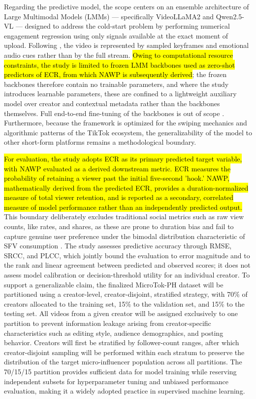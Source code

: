 Regarding the predictive model, the scope centers on an ensemble architecture of Large Multimodal Models (LMMs) — specifically VideoLLaMA2 and Qwen2.5-VL — designed to address the cold-start problem by performing numerical engagement regression using only signals available at the exact moment of upload. Following \cite{sun2025engagement}, the video is represented by sampled keyframes and emotional audio cues rather than by the full stream. \hl{Owing to computational resource constraints, the study is limited to frozen LMM backbones used as zero-shot predictors of ECR, from which NAWP is subsequently derived}; the frozen backbones therefore contain no trainable parameters, and where the study introduces learnable parameters, these are confined to a lightweight auxiliary model over creator and contextual metadata rather than the backbones themselves. Full end-to-end fine-tuning of the backbones is out of scope \cite{li2025vquala}. Furthermore, because the framework is optimized for the swiping mechanics and algorithmic patterns of the TikTok ecosystem, the generalizability of the model to other short-form platforms remains a methodological boundary.

\hl{For evaluation, the study adopts ECR as its primary predicted target variable, with NAWP evaluated as a derived downstream metric. ECR measures the probability of retaining a viewer past the initial five-second 'hook.' NAWP, mathematically derived from the predicted ECR, provides a duration-normalized measure of total viewer retention, and is reported as a secondary, correlated measure of model performance rather than an independently predicted output.} This boundary deliberately excludes traditional social metrics such as raw view counts, like rates, and shares, as these are prone to duration bias and fail to capture genuine user preference under the bimodal distribution characteristic of SFV consumption \cite{sun2025engagement}. The study assesses predictive accuracy through RMSE, SRCC, and PLCC, which jointly bound the evaluation to error magnitude and to the rank and linear agreement between predicted and observed scores; it does not assess model calibration or decision-threshold utility for an individual creator. To support a generalizable claim, the finalized MicroTok-PH dataset will be partitioned using a creator-level, creator-disjoint, stratified strategy, with 70\% of creators allocated to the training set, 15\% to the validation set, and 15\% to the testing set. All videos from a given creator will be assigned exclusively to one partition to prevent information leakage arising from creator-specific characteristics such as editing style, audience demographics, and posting behavior. Creators will first be stratified by follower-count ranges, after which creator-disjoint sampling will be performed within each stratum to preserve the distribution of the target micro-influencer population across all partitions. The 70/15/15 partition provides sufficient data for model training while reserving independent subsets for hyperparameter tuning and unbiased performance evaluation, making it a widely adopted practice in supervised machine learning.

